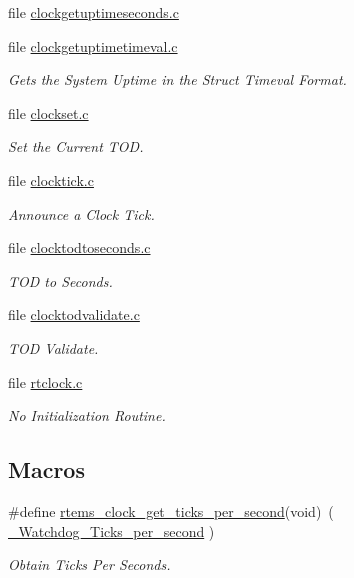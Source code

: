 \begin{DoxyCompactItemize}
file \mbox{\hyperlink{clockgetuptimeseconds_8c}{clockgetuptimeseconds.\+c}}
\item 
file \mbox{\hyperlink{clockgetuptimetimeval_8c}{clockgetuptimetimeval.\+c}}
\begin{DoxyCompactList}\small\item\em Gets the System Uptime in the Struct Timeval Format. \end{DoxyCompactList}\item 
file \mbox{\hyperlink{clockset_8c}{clockset.\+c}}
\begin{DoxyCompactList}\small\item\em Set the Current T\+OD. \end{DoxyCompactList}\item 
file \mbox{\hyperlink{clocktick_8c}{clocktick.\+c}}
\begin{DoxyCompactList}\small\item\em Announce a Clock Tick. \end{DoxyCompactList}\item 
file \mbox{\hyperlink{clocktodtoseconds_8c}{clocktodtoseconds.\+c}}
\begin{DoxyCompactList}\small\item\em T\+OD to Seconds. \end{DoxyCompactList}\item 
file \mbox{\hyperlink{clocktodvalidate_8c}{clocktodvalidate.\+c}}
\begin{DoxyCompactList}\small\item\em T\+OD Validate. \end{DoxyCompactList}\item 
file \mbox{\hyperlink{rtclock_8c}{rtclock.\+c}}
\begin{DoxyCompactList}\small\item\em No Initialization Routine. \end{DoxyCompactList}\end{DoxyCompactItemize}
\subsection*{Macros}
\begin{DoxyCompactItemize}
\item 
\#define \mbox{\hyperlink{group__ClassicClock_ga1d0420ca59ffc8108c7db6d7e07dced7}{rtems\+\_\+clock\+\_\+get\+\_\+ticks\+\_\+per\+\_\+second}}(void)~( \mbox{\hyperlink{group__RTEMSScoreWatchdog_ga637504d63c75c4648a19dd000b8326b8}{\+\_\+\+Watchdog\+\_\+\+Ticks\+\_\+per\+\_\+second}} )
\begin{DoxyCompactList}\small\item\em Obtain Ticks Per Seconds. \end{DoxyCompactList}\end{DoxyCompactItemize}
